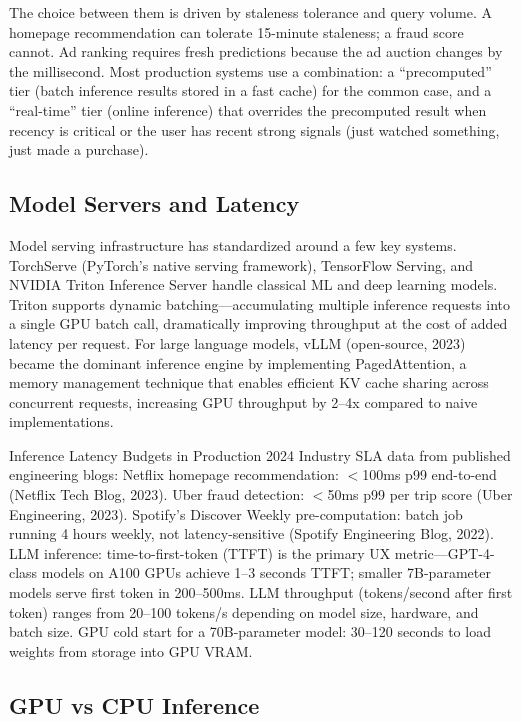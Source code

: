 \documentclass[11pt,a4paper]{article}
\begin{document}
The choice between them is driven by staleness tolerance and query volume. A homepage recommendation can tolerate 15-minute staleness; a fraud score cannot. Ad ranking requires fresh predictions because the ad auction changes by the millisecond. Most production systems use a combination: a ``precomputed'' tier (batch inference results stored in a fast cache) for the common case, and a ``real-time'' tier (online inference) that overrides the precomputed result when recency is critical or the user has recent strong signals (just watched something, just made a purchase).

\subsection{Model Servers and Latency}

Model serving infrastructure has standardized around a few key systems. TorchServe (PyTorch's native serving framework), TensorFlow Serving, and NVIDIA Triton Inference Server handle classical ML and deep learning models. Triton supports dynamic batching---accumulating multiple inference requests into a single GPU batch call, dramatically improving throughput at the cost of added latency per request. For large language models, vLLM (open-source, 2023) became the dominant inference engine by implementing PagedAttention, a memory management technique that enables efficient KV cache sharing across concurrent requests, increasing GPU throughput by 2--4x compared to naive implementations.

\begin{industrybox}{Inference Latency Budgets in Production 2024}
Industry SLA data from published engineering blogs: Netflix homepage recommendation: $<$100ms p99 end-to-end (Netflix Tech Blog, 2023). Uber fraud detection: $<$50ms p99 per trip score (Uber Engineering, 2023). Spotify's Discover Weekly pre-computation: batch job running 4 hours weekly, not latency-sensitive (Spotify Engineering Blog, 2022). LLM inference: time-to-first-token (TTFT) is the primary UX metric---GPT-4-class models on A100 GPUs achieve 1--3 seconds TTFT; smaller 7B-parameter models serve first token in 200--500ms. LLM throughput (tokens/second after first token) ranges from 20--100 tokens/s depending on model size, hardware, and batch size. GPU cold start for a 70B-parameter model: 30--120 seconds to load weights from storage into GPU VRAM.
\end{industrybox}

\subsection{GPU vs CPU Inference}
\end{document}
